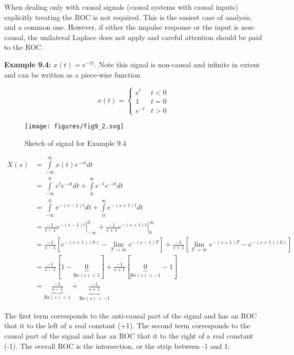 \documentclass{article}
\begin{document}
When dealing only with causal signals (causal systems with causal inputs) explicitly treating the ROC is not required. This is the easiest case of analysis, and a common one. However, if either the impulse response or the input is non-causal, the unilateral Laplace does not apply and careful attention should be paid to the ROC.

\textbf{Example 9.4:} $x(t) = e^{-|t|}$. Note this signal is non-causal and infinite in extent and can be written as a piece-wise function

\[
x(t) = \left\{ \begin{array}{cc}
  e^t & t < 0\\
  1 & t = 0\\
  e^{-t} & t > 0
\end{array}
\right.
\]

\begin{figure}
  \centering
  \texttt{[image: figures/fig9\_2.svg]}
  \caption{Sketch of signal for Example 9.4}
\end{figure}

\begin{align}
  X(s) &= \int\limits_{-\infty}^{\infty} x(t) e^{-st} dt\\
  &= \int\limits_{-\infty}^{0} e^{t} e^{-st} dt + \int\limits_{0}^{\infty} e^{-t} e^{-st} dt\\
  &= \int\limits_{-\infty}^{0} e^{-(s-1)t} dt + \int\limits_{0}^{\infty} e^{-(s+1)t} dt\\
  &= \left. \frac{-1}{s-1} e^{-(s-1)t} \right|_{-\infty}^{0} + \left. \frac{-1}{s+1} e^{-(s+1)t} \right|_{0}^{\infty}\\
  &= \frac{-1}{s-1} \left[e^{-(s+1)(0)} - \lim_{T\rightarrow \infty} e^{-(s-1)T} \right] + \frac{-1}{s+1} \left[\lim_{T\rightarrow \infty} e^{-(s+1)T} - e^{-(s+1)(0)} \right]\\
  &= \frac{-1}{s-1} \left[1 - \underbrace{0}_{\text{Re}(s) < 1} \right] + \frac{-1}{s+1} \left[\underbrace{0}_{\text{Re}(s) > -1} - 1 \right]\\
  &= \underbrace{\frac{-1}{s-1}}_{\text{Re}(s) < 1} +  \underbrace{\frac{-1}{s+1}}_{\text{Re}(s) > -1}
\end{align}

The first term corresponds to the anti-causal part of the signal and has an ROC that it to the left of a real constant (+1). The second term corresponds to the causal part of the signal and has an ROC that it to the right of a real constant (-1). The overall ROC is the intersection, or the strip between -1 and 1:
\end{document}
